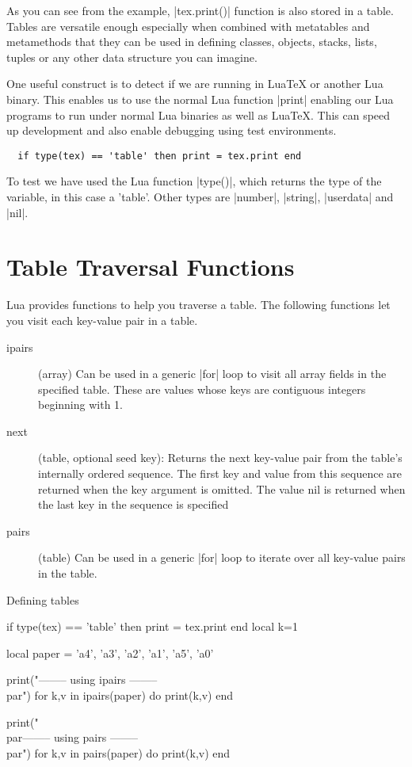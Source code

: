 As you can see from the example, |tex.print()| function is also stored in a table. Tables are versatile enough especially when combined with metatables and metamethods that they can be used in defining classes, objects,  stacks, lists, tuples or any other data structure you can imagine. 

One useful construct is to detect if we are running in LuaTeX or another Lua binary. This enables us to use the normal Lua function |print|  enabling our Lua programs to run under normal Lua binaries as well as LuaTeX. This can speed up development and also enable debugging using test environments.

\begin{scriptexample}{}{}
\begin{verbatim}
  if type(tex) == 'table' then print = tex.print end
\end{verbatim}
\end{scriptexample}

To test we have used the Lua function |type()|, which returns the type of the variable, in this case a 'table'. Other types are |number|, |string|, |userdata| and |nil|. 

\section{Table Traversal Functions}

Lua provides functions to help you traverse a table. The following functions let you visit each key-value pair in a table.

\begin{description}
\item [ipairs] (array) Can be used in a generic |for| loop to visit all array fields in the specified table. These are values whose keys are contiguous integers beginning with 1.
\item [next] (table, optional seed key): Returns the next key-value pair from the table’s internally ordered
sequence. The first key and value from this sequence are returned when the key argument is
omitted. The value nil is returned when the last key in the sequence is specified
\item [pairs] (table) Can be used in a generic |for| loop to iterate over all key-value pairs in the table.
\end{description}

\begin{texexample}{Defining tables}{}
\begin{luacode}
if type(tex) == 'table' then print = tex.print end
local k=1

local paper = {'a4', 'a3', 'a2', 'a1', 'a5', 'a0' }

print("-------- using ipairs --------\\par")
for k,v in ipairs(paper) do
   print(k,v)
end

print("\\par-------- using pairs --------\\par")
for k,v in pairs(paper) do
   print(k,v)
end
\end{luacode}
\end{texexample}





